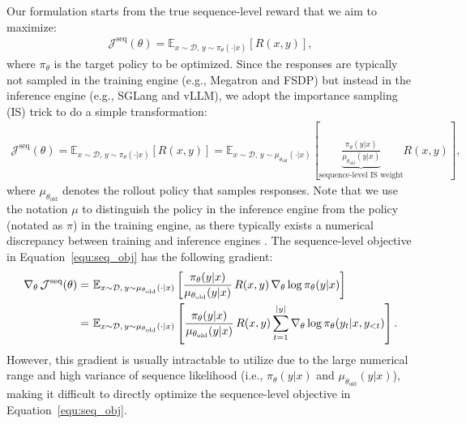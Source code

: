 \documentclass{article}
\begin{document}
Our formulation starts from the true sequence-level reward that we aim to maximize:
\begin{align*}
\mathcal{J}^\text{seq}(\theta)
=
\mathbb{E}_{ x \sim \mathcal{D}, \, y \sim \pi_\theta ( \cdot | x ) }  \left[ R(x, y) \right],
\end{align*}
where \( \pi_\theta \) is the target policy to be optimized.
Since the responses are typically not sampled in the training engine (e.g., Megatron and FSDP) but instead in the inference engine (e.g., SGLang and vLLM), we adopt the importance sampling (IS) trick to do a simple transformation:
\begin{align}
\label{equ:seq_obj}
\mathcal{J}^\text{seq}(\theta)
=
\mathbb{E}_{ x \sim \mathcal{D}, \, y \sim \pi_\theta ( \cdot | x ) }  \left[ R(x, y) \right] 
= 
\mathbb{E}_{ x \sim \mathcal{D}, \, y \sim \mu_{ \theta_\text{old} } ( \cdot | x ) } \left[ 
\underbrace{
    \frac{ \pi_\theta ( y | x ) }{ \mu_{ \theta_\text{old} } ( y | x ) }
}_\text{sequence-level IS weight}
R(x, y) \right],
\end{align}
where \( \mu_{ \theta_\text{old} } \) denotes the rollout policy that samples responses.
Note that we use the notation \( \mu \) to distinguish the policy in the inference engine from the policy (notated as \( \pi \)) in the training engine, as there typically exists a numerical discrepancy between training and inference engines \citep{yao2025offpolicy}.
The sequence-level objective in Equation~\eqref{equ:seq_obj} has the following gradient:
\begin{align}
\nabla_\theta \, \mathcal{J}^\text{seq}(\theta)
= &\ 
\mathbb{E}_{ x \sim \mathcal{D}, \, y \sim \mu_{ \theta_\text{old} } ( \cdot | x ) } \left[ \frac{ \pi_\theta ( y | x ) }{ \mu_{ \theta_\text{old} } ( y | x ) } \, R(x, y) \, \nabla_\theta \log \pi_\theta ( y | x ) \right]  \notag \\
\label{equ:seq_grad}
= &\ 
\mathbb{E}_{ x \sim \mathcal{D}, \, y \sim \mu_{ \theta_\text{old} } ( \cdot | x ) } \left[ \frac{ \pi_\theta ( y | x ) }{ \mu_{ \theta_\text{old} } ( y | x ) } \, R(x, y) \sum_{t=1}^{|y|} \nabla_\theta \log \pi_\theta ( y_t | x, y_{<t} ) \right].
\end{align}
However, this gradient is usually intractable to utilize due to the large numerical range and high variance of sequence likelihood (i.e., \( \pi_\theta ( y | x ) \) and \( \mu_{ \theta_\text{old} } ( y | x ) \)), making it difficult to directly optimize the sequence-level objective in Equation~\eqref{equ:seq_obj}.
\end{document}
